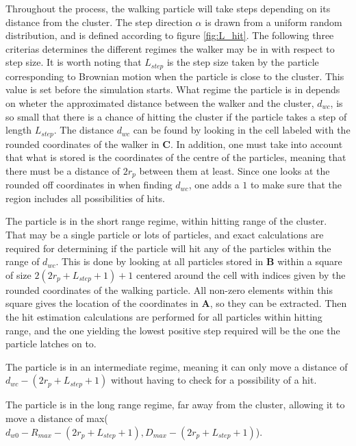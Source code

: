 Throughout the process, the walking particle will take steps depending on its distance from the cluster. The step direction $\alpha$ is drawn from a uniform random distribution, and is defined according to figure \ref{fig:L_hit}. The following three criterias determines the different regimes the walker may be in with respect to step size. It is worth noting that $L_{step}$ is the step size taken by the particle corresponding to Brownian motion when the particle is close to the cluster. This value is set before the simulation starts. What regime the particle is in depends on wheter the approximated distance between the walker and the cluster, $d_{wc}$, is so small that there is a chance of hitting the cluster if the particle takes a step of length $L_{step}$. The distance $d_{wc}$ can be found by looking in the cell labeled with the rounded coordinates of the walker in $\textbf{C}$. In addition, one must take into account that what is stored is the coordinates of the centre of the particles, meaning that there must be a distance of $2r_p$ between them at least. Since one looks at the rounded off coordinates in when finding $d_{wc}$, one adds a $1$ to make sure that the region includes all possibilities of hits.

\begin{itemize}
{\setlength\itemindent{1.0in}\item[$d_{wc} \le 2r_p + L_{step} + 1$:] The particle is in the short range regime, within hitting range of the cluster. That may be a single particle or lots of particles, and exact calculations are required for determining if the particle will hit any of the particles within the range of $d_{wc}$. This is done by looking at all particles stored in $\textbf{B}$ within a square of size $ 2(2r_p + L_{step} + 1)+1$ centered around the cell with indices given by the rounded coordinates of the walking particle. All non-zero elements within this square gives the location of the coordinates in $\textbf{A}$, so they can be extracted. Then the hit estimation calculations are performed for all particles within hitting range, and the one yielding the lowest positive step required will be the one the particle latches on to. 
\item[$ 2r_p + L_{step} + 1 \le  d_{wc} \le D_{max}$:] The particle is in an intermediate regime, meaning it can only move a distance of $d_{wc} - (2r_p + L_{step} + 1)$ without having to check for a possibility of a hit. 
\item[$d_{wc} = D_{max}$:] The particle is in the long range regime, far away from the cluster, allowing it to move a distance of max($d_{w0} - R_{max} - (2r_p + L_{step} + 1), D_{max} - (2r_p + L_{step} + 1)$).}
\end{itemize}

